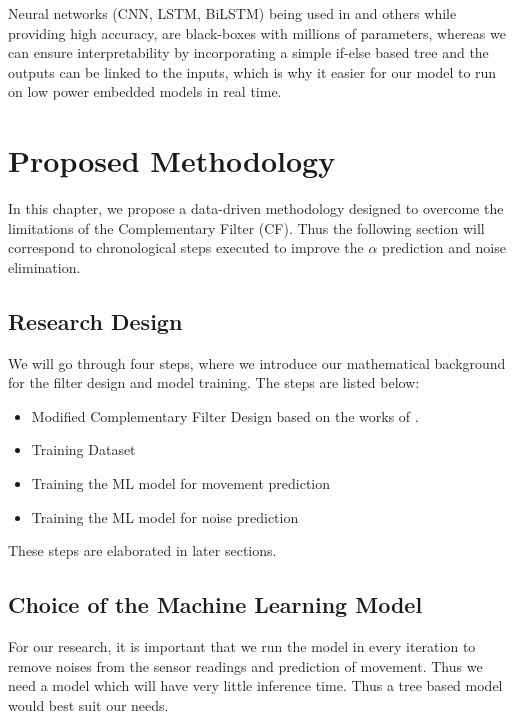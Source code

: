\documentclass{iutbscthesis}
\begin{document}
Neural networks (CNN, LSTM, BiLSTM) being used in \cite{golroudbari2023cnn6DOF} and others while providing high accuracy, are black-boxes with millions of parameters, whereas we can ensure interpretability by incorporating a simple if-else based tree and the outputs can be linked to the inputs, which is why it easier for our model to run on low power embedded models in real time. 



\chapter{Proposed Methodology} \label{chapter:proposed}
In this chapter, we propose a data-driven methodology designed to overcome the limitations of the Complementary Filter (CF). Thus the following section will correspond to chronological steps executed to improve the $\alpha$ prediction and noise elimination.

\section{Research Design}
We will go through four steps, where we introduce our mathematical background for the filter design and model training. The steps are listed below:
\begin{itemize}
    \item Modified Complementary Filter Design based on the works of \cite{vertzberger2022adaptive}.
    \item Training Dataset
    \item Training the ML model for movement prediction
    \item Training the ML model for noise prediction
\end{itemize}

These steps are elaborated in later sections.

\section{Choice of the Machine Learning Model}

For our research, it is important that we run the model in every iteration to remove noises from the sensor readings and prediction of movement. Thus we need a model which will have very little inference time. Thus a tree based model would best suit our needs.
\end{document}

